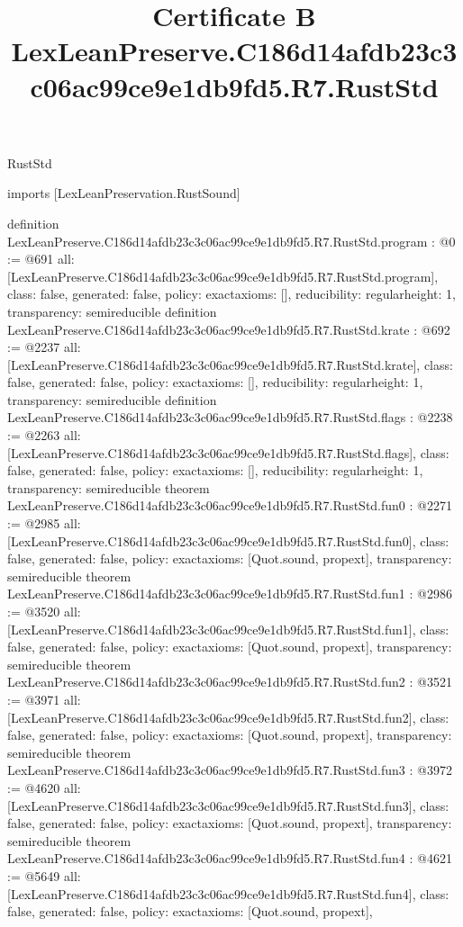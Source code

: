 \begin{lexlean}{RustStd}
\title{Certificate B LexLeanPreserve.C186d14afdb23c3c06ac99ce9e1db9fd5.R7.RustStd}
\begin{coremodule}
imports [LexLeanPreservation.RustSound]

definition LexLeanPreserve.C186d14afdb23c3c06ac99ce9e1db9fd5.R7.RustStd.program : @0 := @691 {
  all: [LexLeanPreserve.C186d14afdb23c3c06ac99ce9e1db9fd5.R7.RustStd.program],
  class: false,
  generated: false,
  policy: exact{axioms: []},
  reducibility: regular{height: 1},
  transparency: semireducible
}
definition LexLeanPreserve.C186d14afdb23c3c06ac99ce9e1db9fd5.R7.RustStd.krate : @692 := @2237 {
  all: [LexLeanPreserve.C186d14afdb23c3c06ac99ce9e1db9fd5.R7.RustStd.krate],
  class: false,
  generated: false,
  policy: exact{axioms: []},
  reducibility: regular{height: 1},
  transparency: semireducible
}
definition LexLeanPreserve.C186d14afdb23c3c06ac99ce9e1db9fd5.R7.RustStd.flags : @2238 := @2263 {
  all: [LexLeanPreserve.C186d14afdb23c3c06ac99ce9e1db9fd5.R7.RustStd.flags],
  class: false,
  generated: false,
  policy: exact{axioms: []},
  reducibility: regular{height: 1},
  transparency: semireducible
}
theorem LexLeanPreserve.C186d14afdb23c3c06ac99ce9e1db9fd5.R7.RustStd.fun0 : @2271 := @2985 {
  all: [LexLeanPreserve.C186d14afdb23c3c06ac99ce9e1db9fd5.R7.RustStd.fun0],
  class: false,
  generated: false,
  policy: exact{axioms: [Quot.sound, propext]},
  transparency: semireducible
}
theorem LexLeanPreserve.C186d14afdb23c3c06ac99ce9e1db9fd5.R7.RustStd.fun1 : @2986 := @3520 {
  all: [LexLeanPreserve.C186d14afdb23c3c06ac99ce9e1db9fd5.R7.RustStd.fun1],
  class: false,
  generated: false,
  policy: exact{axioms: [Quot.sound, propext]},
  transparency: semireducible
}
theorem LexLeanPreserve.C186d14afdb23c3c06ac99ce9e1db9fd5.R7.RustStd.fun2 : @3521 := @3971 {
  all: [LexLeanPreserve.C186d14afdb23c3c06ac99ce9e1db9fd5.R7.RustStd.fun2],
  class: false,
  generated: false,
  policy: exact{axioms: [Quot.sound, propext]},
  transparency: semireducible
}
theorem LexLeanPreserve.C186d14afdb23c3c06ac99ce9e1db9fd5.R7.RustStd.fun3 : @3972 := @4620 {
  all: [LexLeanPreserve.C186d14afdb23c3c06ac99ce9e1db9fd5.R7.RustStd.fun3],
  class: false,
  generated: false,
  policy: exact{axioms: [Quot.sound, propext]},
  transparency: semireducible
}
theorem LexLeanPreserve.C186d14afdb23c3c06ac99ce9e1db9fd5.R7.RustStd.fun4 : @4621 := @5649 {
  all: [LexLeanPreserve.C186d14afdb23c3c06ac99ce9e1db9fd5.R7.RustStd.fun4],
  class: false,
  generated: false,
  policy: exact{axioms: [Quot.sound, propext]},
}
\end{coremodule}
\end{lexlean}
